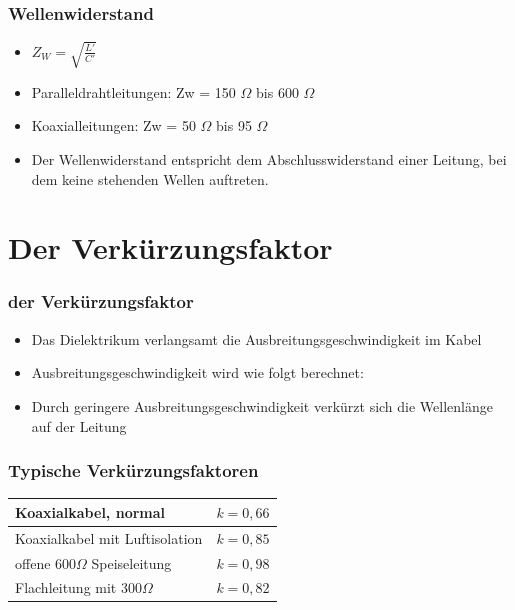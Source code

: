 \begin{frame}
\frametitle{Wellenwiderstand}
\begin{itemize}
	\item \Huge{ $Z_W = \sqrt{\frac{L'}{C'}}$}
	 \normalsize \item Paralleldrahtleitungen: Zw = 150 $\Omega$ bis 600 $\Omega$
	\item Koaxialleitungen: Zw =  50 $\Omega$ bis 95 $\Omega$
	\item Der Wellenwiderstand entspricht dem Abschlusswiderstand einer Leitung, bei dem keine stehenden Wellen auftreten.
\end{itemize}
\end{frame}

\section*{Der Verkürzungsfaktor}
\begin{frame}
\frametitle{der Verkürzungsfaktor}
\begin{itemize}
	\item	Das Dielektrikum verlangsamt die Ausbreitungsgeschwindigkeit im Kabel
	\item	Ausbreitungsgeschwindigkeit wird wie folgt berechnet:
	\item	Durch geringere Ausbreitungsgeschwindigkeit verkürzt sich die Wellenlänge  auf der Leitung
\end{itemize}
\end{frame}

\begin{frame}
\frametitle{Typische Verkürzungsfaktoren}
\begin{center}
\begin{tabular}{|l|l|}
	\hline
	Koaxialkabel, normal & $k = 0,66$ \\ \hline
	Koaxialkabel mit Luftisolation & $k = 0,85$ \\ \hline
	offene $600 \Omega$ Speiseleitung & $k = 0,98$ \\ \hline
	Flachleitung mit $300 \Omega$ & $k = 0,82$ \\ \hline
\end{tabular}
\end{center}
\end{frame}

